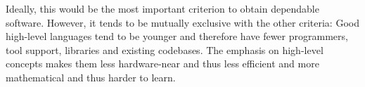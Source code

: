 Ideally, this would be the most important criterion to obtain dependable software.
However, it tends to be mutually exclusive with the other criteria:
Good high-level languages tend to be younger and therefore have fewer programmers, tool support, libraries and existing codebases.
The emphasis on high-level concepts makes them less hardware-near and thus less efficient and more mathematical and thus harder to learn.